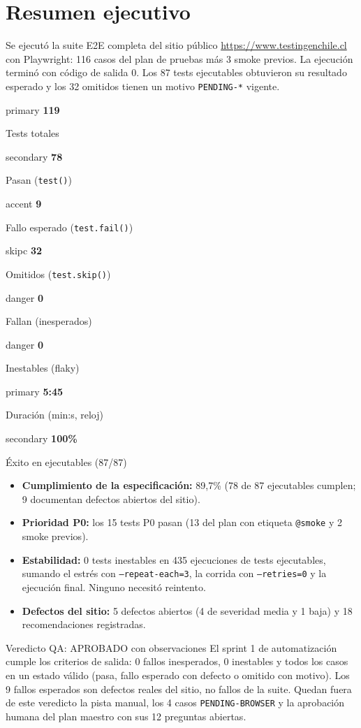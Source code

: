 \documentclass[11pt,a4paper]{article}
\newcommand{\code}[1]{\texttt{#1}}
\newcommand{\kpi}[3]{\begin{kpibox}{#3}%
  {\fontsize{21}{24}\selectfont\bfseries\color{#3}#1}\par\vspace{1pt}%
  {\footnotesize\color{muted}#2}\end{kpibox}}
\begin{document}
\tableofcontents
\clearpage

\section{Resumen ejecutivo}

Se ejecutó la suite E2E completa del sitio público \url{https://www.testingenchile.cl} con Playwright: 116 casos del plan de pruebas más 3 smoke previos. La ejecución terminó con código de salida 0. Los 87 tests ejecutables obtuvieron su resultado esperado y los 32 omitidos tienen un motivo \code{PENDING-*} vigente.

\begin{tcbraster}[raster columns=4, raster equal height, raster column skip=6pt, raster row skip=6pt, raster before skip=8pt, raster after skip=6pt]
\kpi{119}{Tests totales}{primary}
\kpi{78}{Pasan (\code{test()})}{secondary}
\kpi{9}{Fallo esperado (\code{test.fail()})}{accent}
\kpi{32}{Omitidos (\code{test.skip()})}{skipc}
\kpi{0}{Fallan (inesperados)}{danger}
\kpi{0}{Inestables (flaky)}{danger}
\kpi{5:45}{Duración (min:s, reloj)}{primary}
\kpi{100\%}{Éxito en ejecutables (87/87)}{secondary}
\end{tcbraster}

\begin{itemize}
  \item \textbf{Cumplimiento de la especificación:} 89,7\% (78 de 87 ejecutables cumplen; 9 documentan defectos abiertos del sitio).
  \item \textbf{Prioridad P0:} los 15 tests P0 pasan (13 del plan con etiqueta \code{@smoke} y 2 smoke previos).
  \item \textbf{Estabilidad:} 0 tests inestables en 435 ejecuciones de tests ejecutables, sumando el estrés con \code{--repeat-each=3}, la corrida con \code{--retries=0} y la ejecución final. Ninguno necesitó reintento.
  \item \textbf{Defectos del sitio:} 5 defectos abiertos (4 de severidad media y 1 baja) y 18 recomendaciones registradas.
\end{itemize}

\begin{verdictbox}{Veredicto QA: APROBADO con observaciones}
El sprint 1 de automatización cumple los criterios de salida: 0 fallos inesperados, 0 inestables y todos los casos en un estado válido (pasa, fallo esperado con defecto o omitido con motivo). Los 9 fallos esperados son defectos reales del sitio, no fallos de la suite. Quedan fuera de este veredicto la pista manual, los 4 casos \code{PENDING-BROWSER} y la aprobación humana del plan maestro con sus 12 preguntas abiertas.
\end{verdictbox}
\end{document}
